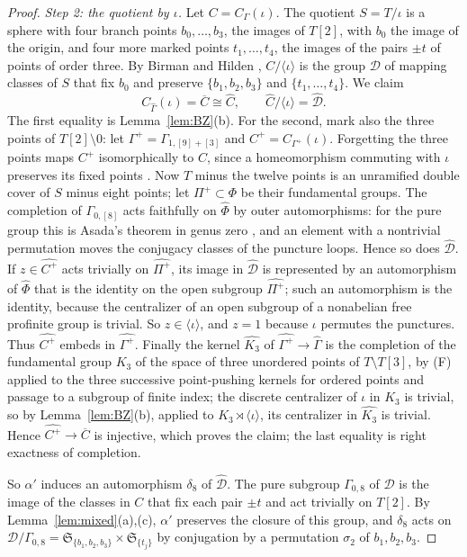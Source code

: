 \documentclass[11pt,a4paper]{article}
\theoremstyle{plain}
\theoremstyle{definition}
\theoremstyle{remark}
\begin{document}
\begin{proof}
\emph{Step 2: the quotient by $\iota$.} Let $C=C_\Gamma(\iota)$. The quotient $S=T/\iota$ is a sphere with four
branch points $b_0,\dots,b_3$, the images of $T[2]$, with $b_0$ the image of the origin, and four more marked
points $t_1,\dots,t_4$, the images of the pairs $\pm t$ of points of order three. By Birman and Hilden \cite{BH},
$C/\langle\iota\rangle$ is the group $\mathcal D$ of mapping classes of $S$ that fix $b_0$ and preserve
$\{b_1,b_2,b_3\}$ and $\{t_1,\dots,t_4\}$. We claim
\[
 C_{\widehat\Gamma}(\iota)=\overline C\cong\widehat C,\qquad \widehat C/\langle\iota\rangle=\widehat{\mathcal D}.
\]
The first equality is Lemma~\ref{lem:BZ}(b). For the second, mark also the three points of
$T[2]\setminus0$: let $\Gamma^+=\Gamma_{1,[9]+[3]}$ and $C^+=C_{\Gamma^+}(\iota)$. Forgetting the three points
maps $C^+$ isomorphically to $C$, since a homeomorphism commuting with $\iota$ preserves its fixed points
\cite{BH}. Now
$T$ minus the twelve points is an unramified double cover of $S$ minus eight points; let $\Pi^+\subset\Phi$ be
their fundamental groups. The completion of $\Gamma_{0,[8]}$ acts faithfully on $\widehat\Phi$ by outer
automorphisms: for the pure group this is Asada's theorem in genus zero \cite{As}, and an element with a nontrivial
permutation moves the conjugacy classes of the puncture loops. Hence so does $\widehat{\mathcal D}$. If $z\in\widehat{C^+}$ acts trivially on
$\widehat{\Pi^+}$, its image in $\widehat{\mathcal D}$ is represented by an automorphism of $\widehat\Phi$ that is
the identity on the open subgroup $\widehat{\Pi^+}$; such an automorphism is the identity, because the centralizer
of an open subgroup of a nonabelian free profinite group is trivial. So $z\in\langle\iota\rangle$, and $z=1$
because $\iota$ permutes the punctures. Thus $\widehat{C^+}$ embeds in $\widehat{\Gamma^+}$. Finally the kernel
$\widehat{K_3}$ of $\widehat{\Gamma^+}\to\widehat\Gamma$ is the completion of the fundamental group $K_3$ of the
space of three unordered points of $T\setminus T[3]$, by (F) applied to the three successive point-pushing
kernels for ordered points and passage to a subgroup of finite index; the discrete centralizer of $\iota$ in $K_3$ is
trivial, so by Lemma~\ref{lem:BZ}(b), applied to $K_3\rtimes\langle\iota\rangle$, its centralizer in
$\widehat{K_3}$ is trivial. Hence $\widehat{C^+}\to\overline C$ is injective, which proves the claim; the last
equality is right exactness of completion.

So $\alpha'$ induces an automorphism $\delta_8$ of $\widehat{\mathcal D}$. The pure subgroup $\Gamma_{0,8}$ of
$\mathcal D$ is the image of the classes in $C$ that fix each pair $\pm t$ and act trivially on $T[2]$. By
Lemma~\ref{lem:mixed}(a),(c), $\alpha'$ preserves the closure of this group, and $\delta_8$ acts on
$\mathcal D/\Gamma_{0,8}=\mathfrak S_{\{b_1,b_2,b_3\}}\times\mathfrak S_{\{t_j\}}$ by conjugation by a permutation
$\sigma_2$ of $b_1,b_2,b_3$.


\end{proof}
\end{document}
